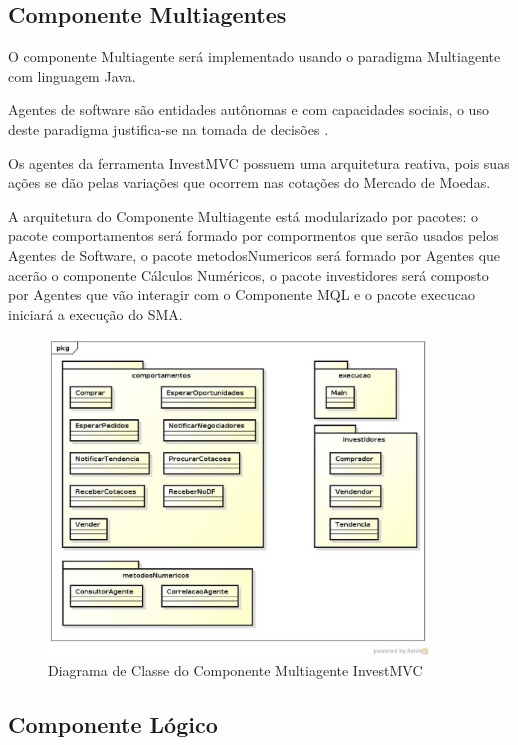 \subsection{Componente Multiagentes}

O componente Multiagente será implementado usando o paradigma Multiagente com linguagem Java. 

Agentes de software são entidades autônomas e com capacidades sociais, o uso deste paradigma justifica-se na tomada de decisões \cite{agentBuilderWhy}. 

Os agentes da ferramenta  InvestMVC possuem uma arquitetura reativa, pois suas ações se dão pelas variações que ocorrem nas cotações do Mercado de Moedas.

A arquitetura do Componente Multiagente está modularizado por pacotes: o pacote comportamentos será formado por compormentos que serão usados pelos Agentes de Software, o pacote metodosNumericos será formado por Agentes que acerão o componente Cálculos Numéricos, o pacote investidores será composto por Agentes que vão interagir com o Componente MQL e o pacote execucao iniciará a execução do SMA.

\begin{figure}[H]
\centering
\includegraphics[width=0.9\textwidth]{figuras/diagramaClassesSMA}
\caption{Diagrama de Classe do Componente Multiagente InvestMVC} 
\label{diagramaClassesSMA}
\end{figure}

\subsection{Componente Lógico}


